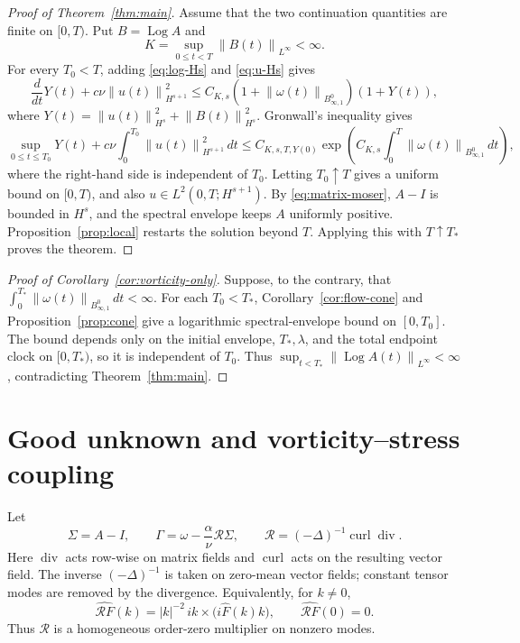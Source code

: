 \documentclass[10pt,a4paper]{amsart}
\numberwithin{equation}{section}
\newcommand{\Id}{I}
\newcommand{\divv}{\operatorname{div}}
\newcommand{\curl}{\operatorname{curl}}
\newcommand{\Log}{\operatorname{Log}}
\newcommand{\Besov}{B^0_{\infty,1}}
\newcommand{\calR}{\mathcal R}
\newcommand{\norm}[1]{\left\lVert #1\right\rVert}
\begin{document}
\begin{proof}[Proof of Theorem~\ref{thm:main}]
Assume that the two continuation quantities are finite on \([0,T)\).  Put
\(B=\Log A\) and
\[
  K=\sup_{0\le t<T}\norm{B(t)}_{L^\infty}<\infty .
\]
For every \(T_0<T\), adding \eqref{eq:log-Hs} and \eqref{eq:u-Hs} gives
\[
  \frac{d}{dt}Y(t)+c\nu\norm{u(t)}_{H^{s+1}}^2
  \le
  C_{K,s}(1+\norm{\omega(t)}_{\Besov})(1+Y(t)),
\]
where \(Y(t)=\norm{u(t)}_{H^s}^2+\norm{B(t)}_{H^s}^2\).  Gronwall's inequality
gives
\[
  \sup_{0\le t\le T_0}Y(t)
  +
  c\nu\int_0^{T_0}\norm{u(t)}_{H^{s+1}}^2\,dt
  \le
  C_{K,s,T,Y(0)}
  \exp\left(
    C_{K,s}\int_0^T\norm{\omega(t)}_{\Besov}\,dt
  \right),
\]
where the right-hand side is independent of \(T_0\).  Letting
\(T_0\uparrow T\) gives a uniform bound on \([0,T)\), and also
\(u\in L^2(0,T;H^{s+1})\).  By
\eqref{eq:matrix-moser},
\(A-\Id\) is bounded in \(H^s\), and the spectral envelope keeps \(A\)
uniformly positive.  Proposition~\ref{prop:local} restarts the solution beyond
\(T\).  Applying this with \(T\uparrow T_*\) proves the theorem.
\end{proof}

\begin{proof}[Proof of Corollary~\ref{cor:vorticity-only}]
Suppose, to the contrary, that
\(\int_0^{T_*}\norm{\omega(t)}_{\Besov}\,dt<\infty\).  For each
\(T_0<T_*\), Corollary~\ref{cor:flow-cone} and Proposition~\ref{prop:cone}
give a logarithmic spectral-envelope bound on \([0,T_0]\).  The bound depends
only on the initial envelope, \(T_*,\lambda\), and the total endpoint clock on
\([0,T_*)\), so it is independent of \(T_0\).  Thus
\(\sup_{t<T_*}\norm{\Log A(t)}_{L^\infty}<\infty\), contradicting
Theorem~\ref{thm:main}.
\end{proof}

\section{Good unknown and vorticity--stress coupling}

Let
\[
  \Sigma=A-\Id,\qquad
  \Gamma=\omega-\frac{\alpha}{\nu}\calR\Sigma,\qquad
  \calR=(-\Delta)^{-1}\curl\divv .
\]
Here \(\divv\) acts row-wise on matrix fields and \(\curl\) acts on the
resulting vector field.  The inverse \((-\Delta)^{-1}\) is taken on zero-mean
vector fields; constant tensor modes are removed by the divergence.
Equivalently, for \(k\ne0\),
\[
  \widehat{\calR F}(k)
  =
  |k|^{-2}\,ik\times\bigl(i\widehat F(k)k\bigr),
  \qquad
  \widehat{\calR F}(0)=0 .
\]
Thus \(\calR\) is a homogeneous order-zero multiplier on nonzero modes.
\end{document}
